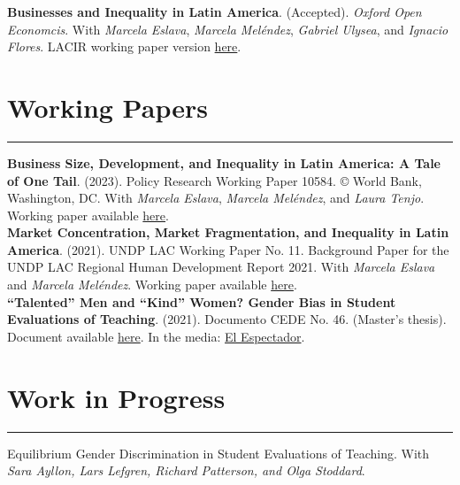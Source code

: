 \documentclass[12pt, letterpaper]{article}
\begin{document}
\noindent \textbf{Businesses and Inequality in Latin America}. (Accepted). \textit{Oxford Open Economcis}.   With \textit{Marcela Eslava}, \textit{Marcela Meléndez}, \textit{Gabriel Ulysea}, and \textit{Ignacio Flores}. LACIR working paper version \href{https://eprints.lse.ac.uk/122760/1/WP_138.pdf}{here}. 

\vspace*{-4mm}

\section*{Working Papers}
\vspace*{-8mm}
\noindent \rule{\linewidth}{0.2mm}

\noindent \textbf{Business Size, Development, and Inequality in Latin America: A Tale of One Tail}. (2023). Policy Research Working Paper 10584. © World Bank, Washington, DC. With \textit{Marcela Eslava}, \textit{Marcela Meléndez}, and \textit{Laura Tenjo}. Working paper available \href{https://nicolasurdaneta.github.io/documents/WB_Business_Size.pdf}{here}. \\ [-3mm]

\noindent \textbf{Market Concentration, Market Fragmentation, and Inequality in Latin America}. (2021). UNDP LAC Working Paper No. 11. Background Paper for the UNDP LAC Regional Human Development Report 2021.  With \textit{Marcela Eslava} and \textit{Marcela Meléndez}. Working paper available \href{https://www.latinamerica.undp.org/content/rblac/en/home/library/poverty/market-concentration--market-fragmentation--and-inequality-in-la.html}{here}. \\ [-3mm]

\noindent \textbf{``Talented'' Men and ``Kind'' Women? Gender Bias in Student Evaluations of Teaching}. (2021). Documento CEDE No. 46. (Master's thesis). Document available \href{https://papers.ssrn.com/sol3/papers.cfm?abstract_id=3919797}{here}. In the media: \href{https://www.elespectador.com/educacion/los-profes-crack-y-las-profes-amables-el-sesgo-de-genero-en-las-aulas/}{El Espectador}.

\vspace{-5mm}

\section*{Work in Progress}
\vspace*{-8mm}
\noindent \rule{\linewidth}{0.2mm}
\noindent Equilibrium Gender Discrimination in Student Evaluations of Teaching. With \textit{Sara Ayllon, Lars Lefgren, Richard Patterson, and Olga Stoddard}. \\ [-3mm]
\end{document}
